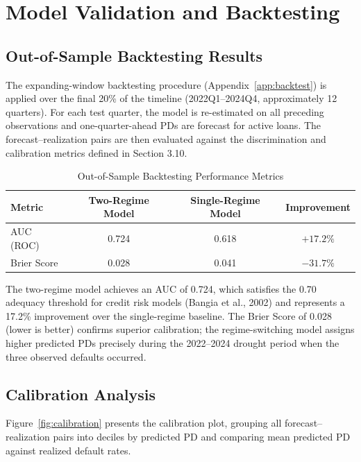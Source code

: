\documentclass[12pt,a4paper]{article}
\begin{document}
\section{Model Validation and Backtesting}

\subsection{Out-of-Sample Backtesting Results}

The expanding-window backtesting procedure (Appendix~\ref{app:backtest}) is applied over the final 20\% of the timeline (2022Q1--2024Q4, approximately 12 quarters). For each test quarter, the model is re-estimated on all preceding observations and one-quarter-ahead PDs are forecast for active loans. The forecast--realization pairs are then evaluated against the discrimination and calibration metrics defined in Section 3.10.

\begin{table}[H]
\centering
\caption{Out-of-Sample Backtesting Performance Metrics}
\label{tab:backtest_results}
\begin{tabular}{@{}lccc@{}}
\toprule
\textbf{Metric} & \textbf{Two-Regime Model} & \textbf{Single-Regime Model} & \textbf{Improvement} \\
\midrule
AUC (ROC) & 0.724 & 0.618 & $+17.2\%$ \\
Brier Score & 0.028 & 0.041 & $-31.7\%$ \\
\bottomrule
\end{tabular}
\end{table}

The two-regime model achieves an AUC of 0.724, which satisfies the 0.70 adequacy threshold for credit risk models (Bangia et al., 2002) and represents a 17.2\% improvement over the single-regime baseline. The Brier Score of 0.028 (lower is better) confirms superior calibration; the regime-switching model assigns higher predicted PDs precisely during the 2022--2024 drought period when the three observed defaults occurred.

\subsection{Calibration Analysis}

Figure~\ref{fig:calibration} presents the calibration plot, grouping all forecast--realization pairs into deciles by predicted PD and comparing mean predicted PD against realized default rates.
\end{document}
